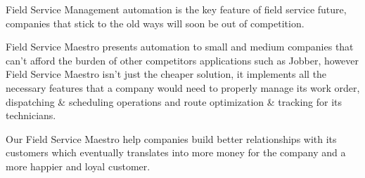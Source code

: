 Field Service Management automation is the key feature of field service future, companies that stick to the old ways will soon be out of competition.

Field Service Maestro presents automation to small and medium companies that can't afford the burden of other competitors applications such as Jobber, however Field Service Maestro isn't just the cheaper solution, it implements all the necessary features that a company would need to properly manage its work order, dispatching \& scheduling operations and route optimization \& tracking for its technicians.

Our Field Service Maestro help companies build better relationships with its customers which eventually translates into more money for the company and a more happier and loyal customer. 